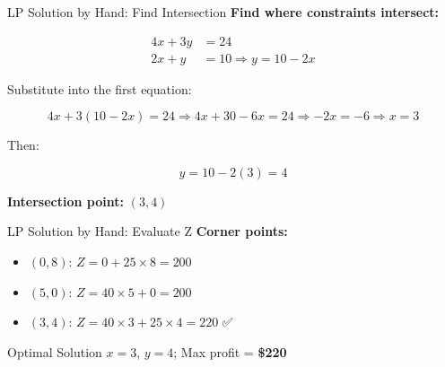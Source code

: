 \documentclass{purdue-slide}
\begin{document}
\begin{frame}{LP Solution by Hand: Find Intersection}
    \textbf{Find where constraints intersect:}

    \[
    \begin{aligned}
    4x + 3y &= 24 \\
    2x + y &= 10 \Rightarrow y = 10 - 2x
    \end{aligned}
    \]

    Substitute into the first equation:

    \[
    4x + 3(10 - 2x) = 24 \Rightarrow 4x + 30 - 6x = 24 \Rightarrow -2x = -6 \Rightarrow x = 3
    \]

    Then:

    \[
    y = 10 - 2(3) = 4
    \]

    \textbf{Intersection point: } \((3, 4)\)
\end{frame}

\begin{frame}{LP Solution by Hand: Evaluate Z}
    \textbf{Corner points:}
    \begin{itemize}
        \item \((0, 8)\): \(Z = 0 + 25 \times 8 = 200\)
        \item \((5, 0)\): \(Z = 40 \times 5 + 0 = 200\)
        \item \((3, 4)\): \(Z = 40 \times 3 + 25 \times 4 = 220\) ✅
    \end{itemize}

    \begin{alertblock}{Optimal Solution}
        \(x = 3\), \(y = 4\); Max profit = \textbf{\$220}
    \end{alertblock}
\end{frame}
\end{document}

